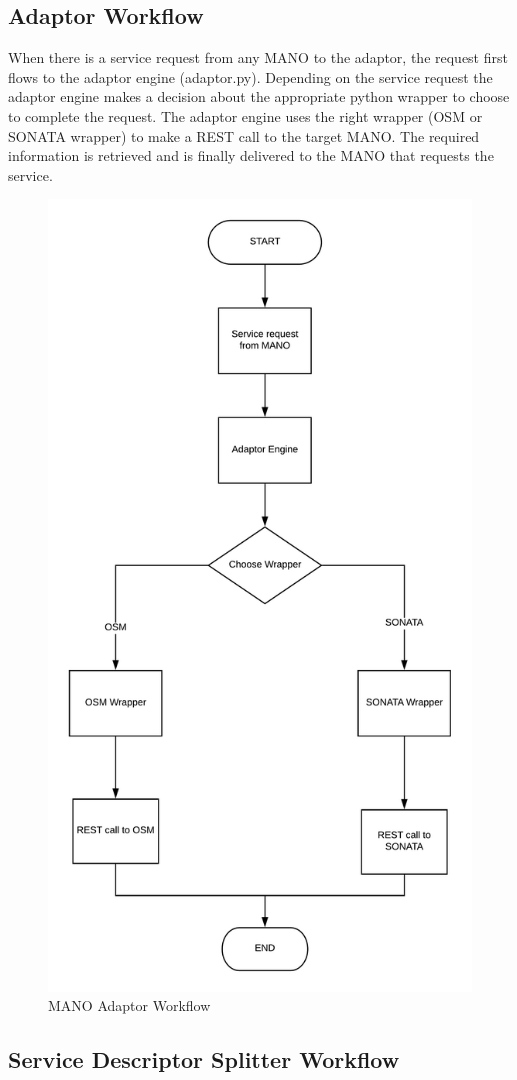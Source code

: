 \subsection{Adaptor Workflow}
When there is a service request from any MANO to the adaptor, the request first flows to the adaptor engine (adaptor.py). Depending on the service request the adaptor engine makes a decision about the appropriate python wrapper to choose to complete the request. The adaptor engine uses the right wrapper (OSM or SONATA wrapper) to make a REST call to the target MANO. The required information is  retrieved and is finally delivered to the MANO that requests the service.
\begin{figure}[H]
	\centering
	\includegraphics[width=0.7\linewidth]{figures/MA_Workflow}
	\caption{MANO Adaptor Workflow}
	\label{fig:maworkflow}
\end{figure}

\subsection{Service Descriptor Splitter Workflow}

